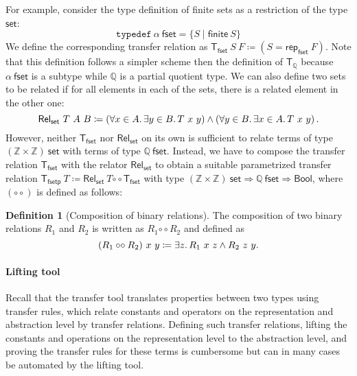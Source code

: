 \documentclass{article}
\theoremstyle{definition}
\newtheorem{definition}{Definition}[section]
\newcommand{\relcomp}{\mathbin{\circ\circ}}
\newcommand{\bool}{\mathsf{Bool}}
\newcommand{\inte}{\mathbb{Z}}
\newcommand{\rat}{\mathbb{Q}}
\newcommand{\rep}{\mathsf{rep}}
\begin{document}
For example, consider the type definition of finite sets as a restriction of the type \(\mathsf{set}\):
\begin{equation*}
	\mathtt{typedef}\ \alpha\ \mathsf{fset} = \{S \mid \mathsf{finite}\ S\}
\end{equation*}
We define the corresponding transfer relation as \(\mathsf{T_{fset}}\ S\ F \coloneqq (S = \rep_\mathsf{fset}\ F)\). Note that this definition follows a simpler scheme then the definition of \(\mathsf{T_\rat}\) because \(\alpha\ \mathsf{fset}\) is a subtype while \(\rat\) is a partial quotient type.
We can also define two sets to be related
if for all elements in each of the sets,
there is a related element in the other one:
\begin{equation*}
	\mathsf{Rel_{set}}\ T\ A\ B \coloneqq (\forall x \in A\ldotp \exists y \in B\ldotp T\ x\ y) \land  (\forall y \in B\ldotp \exists x \in A\ldotp T\ x\ y)\,.
\end{equation*}
However, neither \(\mathsf{T_{fset}}\) nor \(\mathsf{Rel_{set}}\) on its own
is sufficient to relate terms of type \((\inte \times \inte)\ \mathsf{set}\) with terms of type \(\rat\ \mathsf{fset}\).
Instead, we have to compose the transfer relation \(\mathsf{T_{fset}}\) with the relator \(\mathsf{Rel_{set}}\)
to obtain a suitable parametrized transfer relation \(\mathsf{T_{fset p}}\ T \coloneqq \mathsf{Rel_{set}}\ T \relcomp \mathsf{T_{fset}}\)
with type \((\inte \times \inte)\ \mathsf{set} \Rightarrow \rat\ \mathsf{fset} \Rightarrow \bool \),
where $(\relcomp)$ is defined as follows:
\begin{definition}[Composition of binary relations]
	The composition of two binary relations \(R_1\) and \(R_2\) is written as \(R_1 \relcomp R_2\) and defined as
	\begin{equation}
		(R_1 \relcomp R_2)\ x\ y \coloneqq \exists z\ldotp R_1\ x\ z \land R_2\ z\ y.
	\end{equation}
\end{definition}

\paragraph{Lifting tool} Recall that the transfer tool translates properties between two types using transfer rules, which relate constants and operators on the representation and abstraction level by transfer relations.
Defining such transfer relations,
lifting the constants and operations on the representation level to the abstraction level,
and proving the transfer rules for these terms
is cumbersome but can in many cases be automated by the lifting tool.
\end{document}
